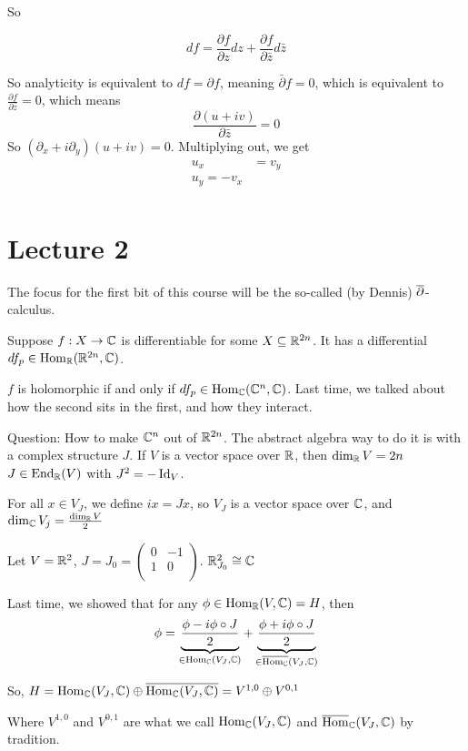 \documentclass[x11names,reqno,14pt]{extarticle}
\begin{document}
So 

\[
df = \frac{\partial f}{\partial z}dz + \frac{\partial f}{\partial \bar{z}}d\bar{z}
\]

So analyticity is equivalent to $df = \partial f$, meaning $\bar{\partial}f = 0$, which is equivalent to $\frac{\partial f}{\partial \bar{z}} = 0$, which means
\[
\frac{\partial (u + iv)}{\partial\bar{z}} = 0
\]
So $(\partial_x + i\partial_y)(u + iv) = 0$. Multiplying out, we get
\begin{align*}
u_x & = v_y \\
u_y = - v_x \\
\end{align*}

\section*{Lecture 2} 

The focus for the first bit of this course will be the so-called (by Dennis) $\overline{\partial}$-calculus. 

Suppose $f:X\to\mathbb{C}$ is differentiable for some $X \subseteq \mathbb{R}^{2n}$. It has a differential $df_p \in {\mathrm{Hom}}_{\mathbb{R}}(\mathbb{R}^{2n},\mathbb{C})$.

$f$ is holomorphic if and only if $df_p\in{\mathrm{Hom}}_{\mathbb{C}}(\mathbb{C}^n, \mathbb{C})$. Last time, we talked about how the second sits in the first, and how they interact. 

Question: How to make $\mathbb{C}^n$ out of $\mathbb{R}^{2n}$. The abstract algebra way to do it is with a complex structure $J$. If $V$ is a vector space over $\mathbb{R}$, then $\dim_{\mathbb{R}} V = 2n$
$J\in{\mathrm{End}}_{\mathbb{R}}(V)$ with $J^2 = -\operatorname{\mathrm{Id}}_V$. 

For all $x \in V_J$, we define $ix = Jx$, so $V_J$ is a vector space over $\mathbb{C}$, and $\dim_{\mathbb{C}} V_j = \frac{\dim_{\mathbb{R}} V}{2}$

\exm Let $V = \mathbb{R}^2$, $J = J_0 = \begin{pmatrix} 0 & -1 \\ 1 & 0 \\ \end{pmatrix}$. $\mathbb{R}^2_{J_0}\cong \mathbb{C}$

Last time, we showed that for any $\phi\in{\mathrm{Hom}}_{\mathbb{R}}(V,\mathbb{C}) = H$, then 
\[
\phi = \underbrace{\frac{\phi - i\phi\circ J}{2}}_{\in {\mathrm{Hom}}_{\mathbb{C}}(V_J,\mathbb{C})} + \underbrace{\frac{\phi + i\phi\circ J}{2}}_{\in\overline{{\mathrm{Hom}}_{\mathbb{C}}}(V_J,\mathbb{C})}
\]

So, $H = {\mathrm{Hom}}_{\mathbb{C}}(V_J,\mathbb{C})\oplus\overline{{\mathrm{Hom}}_{\mathbb{C}}(V_J,\mathbb{C})} = V^{1, 0}\oplus V^{0, 1}$

Where $V^{1, 0}$ and $V^{0, 1}$ are what we call ${\mathrm{Hom}}_{\mathbb{C}}(V_J,\mathbb{C})$ and $\overline{{\mathrm{Hom}}}_{\mathbb{C}}(V_J,\mathbb{C})$ by tradition. 
\end{document}
